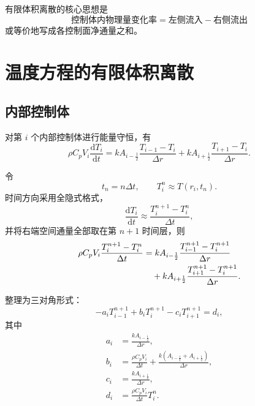 \documentclass[UTF8,a4paper,12pt]{ctexart}
\begin{document}
有限体积离散的核心思想是
\[
\boxed{\text{控制体内物理量变化率}
=
\text{左侧流入}
-
\text{右侧流出}}
\]
或等价地写成各控制面净通量之和。

\section{温度方程的有限体积离散}

\subsection{内部控制体}

对第 $i$ 个内部控制体进行能量守恒，有
\begin{equation}
    \rho C_pV_i\frac{\mathrm{d}T_i}{\mathrm{d}t}
    =
    kA_{i-\frac12}\frac{T_{i-1}-T_i}{\Delta r}
    +
    kA_{i+\frac12}\frac{T_{i+1}-T_i}{\Delta r}.
    \label{eq:heat-fvm-semidiscrete}
\end{equation}

令
\begin{equation}
    t_n=n\Delta t,
    \qquad
    T_i^n\approx T(r_i,t_n).
\end{equation}
时间方向采用全隐式格式，
\begin{equation}
    \frac{\mathrm{d}T_i}{\mathrm{d}t}
    \approx
    \frac{T_i^{n+1}-T_i^n}{\Delta t},
\end{equation}
并将右端空间通量全部取在第 $n+1$ 时间层，则
\begin{align}
    \rho C_pV_i
    \frac{T_i^{n+1}-T_i^n}{\Delta t}
    &=
    kA_{i-\frac12}
    \frac{T_{i-1}^{n+1}-T_i^{n+1}}{\Delta r}
    \notag\\
    &\quad+
    kA_{i+\frac12}
    \frac{T_{i+1}^{n+1}-T_i^{n+1}}{\Delta r}.
    \label{eq:heat-implicit}
\end{align}

整理为三对角形式：
\begin{equation}
    -a_iT_{i-1}^{n+1}
    +b_iT_i^{n+1}
    -c_iT_{i+1}^{n+1}
    =d_i,
    \label{eq:tridiag-row}
\end{equation}
其中
\begin{align}
    a_i&=\frac{kA_{i-\frac12}}{\Delta r},\\
    b_i&=\frac{\rho C_pV_i}{\Delta t}
        +\frac{k(A_{i-\frac12}+A_{i+\frac12})}{\Delta r},\\
    c_i&=\frac{kA_{i+\frac12}}{\Delta r},\\
    d_i&=\frac{\rho C_pV_i}{\Delta t}T_i^n.
\end{align}
\end{document}
